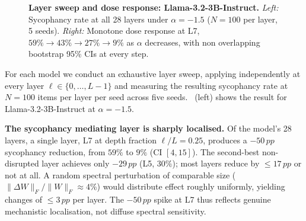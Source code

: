 \documentclass{article}
\newcommand{\pp}{\,pp}
\begin{document}
\begin{figure}[t]

\caption{\textbf{Layer sweep and dose response: Llama-3.2-3B-Instruct.}
\emph{Left:} Sycophancy rate at all 28 layers under
$\alpha{=}{-}1.5$ ($N{=}100$ per layer, 5 seeds).
\emph{Right:} Monotone dose response at L7,
$59\%\!\to\!43\%\!\to\!27\%\!\to\!9\%$ as $\alpha$ decreases, with
non overlapping bootstrap 95\% CIs at every step.}
\label{fig:sweep}
\end{figure}

For each model we conduct an exhaustive layer sweep, applying
 independently at every layer
$\ell \in \{0,\ldots,L{-}1\}$ and measuring the resulting sycophancy
rate at $N{=}100$ items per layer per seed across five seeds.
~(left) shows the result for Llama-3.2-3B-Instruct
at $\alpha{=}{-}1.5$.

\textbf{The sycophancy mediating layer is sharply localised.}
Of the model's 28 layers, a single layer, L7 at depth fraction
$\ell/L = 0.25$, produces a $-50\pp$ sycophancy reduction, from
$59\%$ to $9\%$ (CI $[4,15]$).
The second-best non-disrupted layer achieves only $-29\pp$
(L5, $30\%$); most layers reduce by $\le 17\pp$ or not at all.
A random spectral perturbation of comparable size
($\|\Delta W\|_F/\|W\|_F \approx 4\%$) would distribute effect
roughly uniformly, yielding changes of $\le 3\pp$ per layer.
The $-50\pp$ spike at L7 thus reflects genuine mechanistic
localisation, not diffuse spectral sensitivity.
\end{document}
